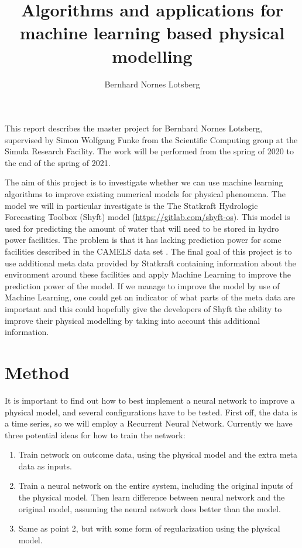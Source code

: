 \documentclass[a4paper,12pt,english]{article}
\title{Algorithms and applications for machine learning based physical modelling}
\author{Bernhard Nornes Lotsberg}
\begin{document}
\maketitle
This report describes the master project for Bernhard Nornes Lotsberg, supervised by Simon Wolfgang Funke from the Scientific Computing group at the Simula Research Facility. The work will be performed from the spring of 2020 to the end of the spring of 2021.

The aim of this project is to investigate whether we can use machine learning algorithms to improve existing numerical models for physical phenomena. The model we will in particular investigate is the The Statkraft Hydrologic Forecasting Toolbox (Shyft) model (\url{https://gitlab.com/shyft-os}). This model is used for predicting the amount of water that will need to be stored in hydro power facilities. The problem is that it has lacking prediction power for some facilities described in the CAMELS data set \cite{newman2014large}.
 The final goal of this project is to use additional meta data provided by Statkraft containing information about the environment around these facilities and apply Machine Learning to improve the prediction power of the model. If we manage to improve the model by use of Machine Learning, one could get an indicator of what parts of the meta data are important and this could hopefully give the developers of Shyft the ability to improve their physical modelling by taking into account this additional information.
 
 \section{Method}
 It is important to find out how to best implement a neural network to improve a physical model, and several configurations have to be tested. First off, the data is a time series, so we will employ a Recurrent Neural Network. Currently we have three potential ideas for how to train the network:
 \begin{enumerate}
 \item Train network on outcome data, using the physical model and the extra meta data as inputs.
 \item Train a neural network on the entire system, including the original inputs of the physical model. Then learn difference between neural network and the original model, assuming the neural network does better than the model.
 \item Same as point 2, but with some form of regularization using the physical model.
 \end{enumerate}
 
\end{document}
